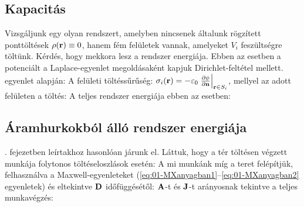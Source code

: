   \subsection{Kapacitás}
   
   Vizsgáljunk egy olyan rendszert, amelyben nincsenek általunk rögzített ponttöltések $\rho(\mathbf{r})\equiv 0$, hanem fém felületek vannak, amelyeket $V_i$ feszültségre töltünk. Kérdés, hogy mekkora lesz a rendszer energiája. Ebben az esetben a potenciált a Laplace-egyenlet megoldásaként kapjuk Dirichlet-feltétel mellett.  egyenlet alapján:
   A felületi töltéssűrűség: $\sigma_i(\mathbf{r})=-\varepsilon_0\left.\frac{\partial \phi}{\partial \mathbf{n}}\right|_{\mathbf{r}\in S_i}$, mellyel az adott felületen a töltés:
   A teljes rendszer energiája ebben az esetben:
   
  \subsection{Áramhurkokból álló rendszer energiája}
   
   . fejezetben leírtakhoz hasonlóan járunk el. Láttuk, hogy a tér töltésen végzett munkája folytonos töltéseloszlások esetén:
   A mi munkánk míg a teret felépítjük, felhasználva a Maxwell-egyenleteket (\eqref{eq:01-MXanyagban1}--\eqref{eq:01-MXanyagban2} egyenletek) és eltekintve $\mathbf{D}$ időfüggésétől:
   $\mathbf{A}$-t és $\mathbf{J}$-t arányosnak tekintve a teljes munkavégzés:
   

